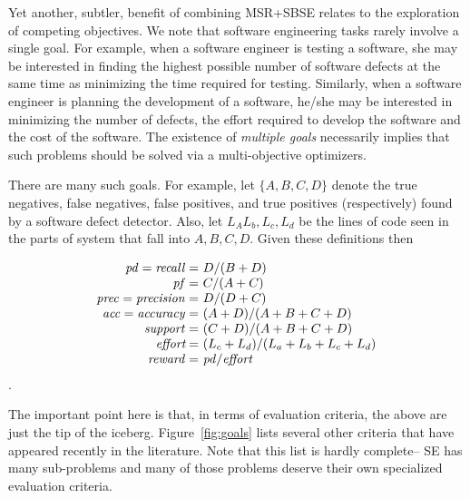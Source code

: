 \documentclass[sigconf,anonymous,review]{acmart}
\begin{document}
 
 
 Yet another, subtler, benefit of combining MSR+SBSE relates to the exploration of competing
 objectives.
 We note that  
 software engineering tasks rarely involve a
single goal. For example, when a software engineer
is testing a software, she may be interested in
finding the highest possible number of software
defects at the same time as minimizing the time
required for testing. Similarly, when a software
engineer is planning the development of a software,
he/she may be interested in minimizing the number of
defects, the effort required to develop the software
and the cost of the software. The existence of {\em
multiple goals} necessarily implies that such problems should be solved via
a   multi-objective optimizers.

There are many such goals. For example, 
let $\{A,B,C,D\}$ denote the
true negatives,
false negatives,
false positives, and
true positives
(respectively) found by a software defect detector.
Also, let $L_A L_b, L_c, L_d$ be the lines of code
seen in the parts of system that fall
into $A,B,C,D$. Given these definitions then




{\small\[
\begin{array}{r@{~}l}
\mathit{pd}=\mathit{recall}=&D / (B+D)\\
\mathit{pf}=&C / (A+C)\\
\mathit{prec}=\mathit{precision}=&D / (D+C)\\
\mathit{acc}=\mathit{accuracy}=&(A+D) / (A+B+C+D)\\
\mathit{support}=&(C+D) / (A+B+C+D)\\
\textit{effort}=&(L_c+L_d) / (L_a + L_b + L_c + L_d)\\
\mathit{reward}=&\mathit{pd} / \textit{effort}
\end{array}
\]}.






The important point here is that, in terms of evaluation criteria,  the above are just the tip of the iceberg.
Figure~\ref{fig:goals} lists several other criteria that have appeared recently in the literature. Note that this list is hardly complete-- SE has many sub-problems and many of those
problems deserve their own specialized evaluation criteria.
\end{document}
